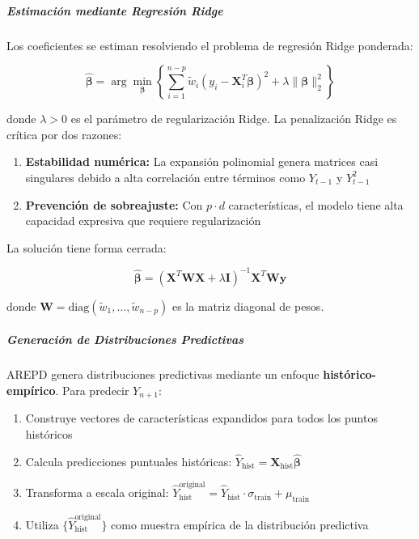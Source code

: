 \subparagraph{Estimación mediante Regresión Ridge}

Los coeficientes se estiman resolviendo el problema de regresión Ridge ponderada:

\begin{equation}
\hat{\boldsymbol{\beta}} = \arg\min_{\boldsymbol{\beta}} \left\{\sum_{i=1}^{n-p} \tilde{w}_i \left(y_i - \mathbf{X}_i^T \boldsymbol{\beta}\right)^2 + \lambda \|\boldsymbol{\beta}\|_2^2\right\}
\end{equation}

donde $\lambda > 0$ es el parámetro de regularización Ridge. La penalización Ridge es crítica por dos razones:

\begin{enumerate}
\item \textbf{Estabilidad numérica:} La expansión polinomial genera matrices casi singulares debido a alta correlación entre términos como $Y_{t-1}$ y $Y_{t-1}^2$
\item \textbf{Prevención de sobreajuste:} Con $p \cdot d$ características, el modelo tiene alta capacidad expresiva que requiere regularización
\end{enumerate}

La solución tiene forma cerrada:

\begin{equation}
\hat{\boldsymbol{\beta}} = \left(\mathbf{X}^T\mathbf{W}\mathbf{X} + \lambda\mathbf{I}\right)^{-1}\mathbf{X}^T\mathbf{W}\mathbf{y}
\end{equation}

donde $\mathbf{W} = \text{diag}(\tilde{w}_1, \ldots, \tilde{w}_{n-p})$ es la matriz diagonal de pesos.

\subparagraph{Generación de Distribuciones Predictivas}

AREPD genera distribuciones predictivas mediante un enfoque \textbf{histórico-empírico}. Para predecir $Y_{n+1}$:

\begin{enumerate}
\item Construye vectores de características expandidos para todos los puntos históricos
\item Calcula predicciones puntuales históricas: $\hat{Y}_{\text{hist}} = \mathbf{X}_{\text{hist}} \hat{\boldsymbol{\beta}}$
\item Transforma a escala original: $\hat{Y}_{\text{hist}}^{\text{original}} = \hat{Y}_{\text{hist}} \cdot \sigma_{\text{train}} + \mu_{\text{train}}$
\item Utiliza $\{\hat{Y}_{\text{hist}}^{\text{original}}\}$ como muestra empírica de la distribución predictiva
\end{enumerate}

